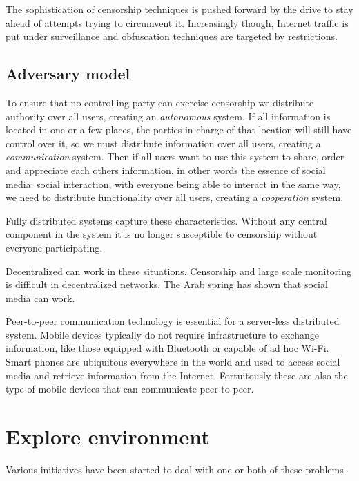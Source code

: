 The sophistication of censorship techniques is pushed forward by the drive to stay ahead of attempts trying to circumvent it.
Increasingly though, Internet traffic is put under surveillance and obfuscation techniques are targeted by restrictions.


\subsection{Adversary model}
To ensure that no controlling party can exercise censorship we distribute authority over all users, creating an \emph{autonomous} system.
If all information is located in one or a few places, the parties in charge of that location will still have control over it, so we must distribute information over all users, creating a \emph{communication} system.
Then if all users want to use this system to share, order and appreciate each others information, in other words the essence of social media: social interaction, with everyone being able to interact in the same way, we need to  distribute functionality over all users, creating a \emph{cooperation} system.

Fully distributed systems capture these characteristics.
Without any central component in the system it is no longer susceptible to censorship without everyone participating.

Decentralized can work in these situations.
Censorship and large scale monitoring is difficult in decentralized networks.
The Arab spring has shown that social media can work. \cite{Johan_2001}

Peer-to-peer communication technology is essential for a server-less distributed system.
Mobile devices typically do not require infrastructure to exchange information, like those equipped with Bluetooth or capable of ad hoc Wi-Fi.
Smart phones are ubiquitous everywhere in the world and used to access social media and retrieve information from the Internet.
Fortuitously these are also the type of mobile devices that can communicate peer-to-peer.



\section{Explore environment}

Various initiatives have been started to deal with one or both of these problems. \cite{re_decentralize}

